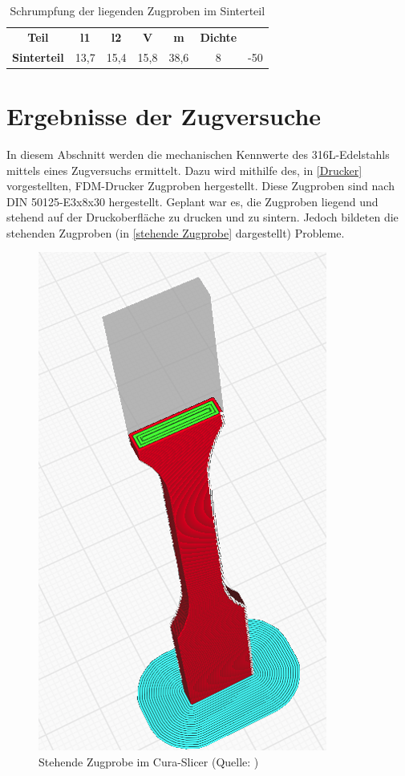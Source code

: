 \begin{table}[h]
    \centering
    \caption{Schrumpfung der liegenden Zugproben im Sinterteil}
      \begin{tabular}{ccccccc}
      \toprule
      \textbf{Teil} & \multicolumn{1}{c}{\textbf{l1}} & \multicolumn{1}{c}{\textbf{l2}} & \multicolumn{1}{c}{\textbf{V}} & \multicolumn{1}{c}{\textbf{m}} & \multicolumn{1}{c}{\textbf{Dichte}} \\
        \textbf{Sinterteil} & 13,7 & 15,4 & 15,8 & 38,6 & 8 & -50 \\
      \bottomrule
      \end{tabular}%
    \label{Schrumpfung Zugproben}%
  \end{table}%
  \FloatBarrier

\section{Ergebnisse der Zugversuche}

In diesem Abschnitt werden die mechanischen Kennwerte des 316L-Edelstahls mittels eines Zugversuchs ermittelt. Dazu wird mithilfe des, in \autoref{Drucker} vorgestellten, FDM-Drucker Zugproben hergestellt. Diese Zugproben sind nach DIN 50125-E3x8x30 hergestellt.
Geplant war es, die Zugproben liegend und stehend auf der Druckoberfläche zu drucken und zu sintern. Jedoch bildeten die stehenden Zugproben (in \autoref{stehende Zugprobe} dargestellt) Probleme.

\begin{figure}[h] 
  \centering
  \includegraphics[width=0.5\linewidth]{bilder/Screenshot 2023-11-01 171423.png}
        \caption[Stehende Zugprobe im Cura-Slicer] {Stehende Zugprobe im Cura-Slicer (Quelle: \autocite{Prusa})}
  \label{stehende Zugprobe}
\end{figure}
\FloatBarrier

